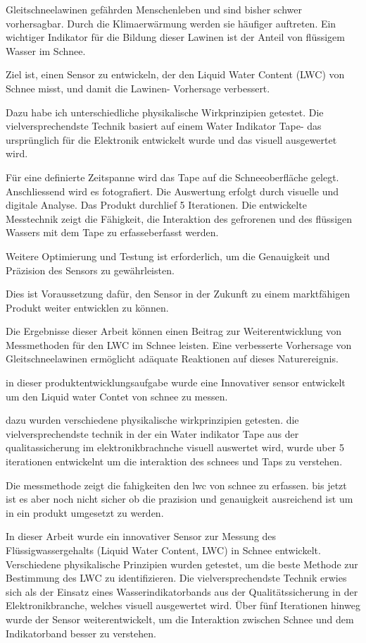 Gleitschneelawinen gefährden Menschenleben und sind bisher schwer vorhersagbar. Durch die Klimaerwärmung werden sie häufiger auftreten. Ein wichtiger Indikator für die Bildung dieser Lawinen ist der Anteil von flüssigem Wasser im Schnee.

Ziel ist, einen Sensor zu entwickeln, der den Liquid Water Content (LWC) von Schnee misst, und damit die Lawinen- Vorhersage verbessert.

Dazu habe ich unterschiedliche  physikalische Wirkprinzipien getestet. 
Die vielversprechendste Technik basiert auf einem Water Indikator Tape- das ursprünglich für die Elektronik entwickelt wurde und  das visuell ausgewertet wird.

 Für eine definierte Zeitspanne wird das Tape auf die Schneeoberfläche gelegt. Anschliessend wird es fotografiert. Die Auswertung erfolgt durch visuelle und digitale Analyse.
Das Produkt durchlief 5 Iterationen. Die entwickelte Messtechnik zeigt die Fähigkeit, die Interaktion des gefrorenen und des flüssigen Wassers mit dem Tape zu erfasseberfasst werden.

Weitere Optimierung und Testung ist erforderlich, um die Genauigkeit und Präzision des Sensors zu gewährleisten.

Dies ist Voraussetzung dafür, den Sensor in der Zukunft zu einem marktfähigen Produkt weiter entwicklen zu können.

Die Ergebnisse dieser Arbeit können einen Beitrag zur Weiterentwicklung von Messmethoden für den LWC im Schnee leisten. Eine  verbesserte Vorhersage von Gleitschneelawinen ermöglicht adäquate Reaktionen auf dieses Naturereignis. 

\iffalse


in dieser produktentwicklungsaufgabe wurde eine Innovativer sensor entwickelt um den Liquid water Contet von schnee zu messen.

dazu wurden verschiedene physikalische wirkprinzipien getesten. die vielversprechendste technik in der ein Water indikator Tape aus der qualitassicherung im elektronikbrachnche visuell auswertet wird, wurde uber 5 iterationen entwickelnt um die interaktion des schnees und Taps zu verstehen.


Die messmethode zeigt die fahigkeiten den lwc von schnee zu erfassen. bis jetzt ist es aber noch nicht sicher ob die prazision und genauigkeit ausreichend ist um in ein produkt umgesetzt zu werden.


In dieser Arbeit wurde ein innovativer Sensor zur Messung des Flüssigwassergehalts (Liquid Water Content, LWC) in Schnee entwickelt. Verschiedene physikalische Prinzipien wurden getestet, um die beste Methode zur Bestimmung des LWC zu identifizieren. Die vielversprechendste Technik erwies sich als der Einsatz eines Wasserindikatorbands aus der Qualitätssicherung in der Elektronikbranche, welches visuell ausgewertet wird. Über fünf Iterationen hinweg wurde der Sensor weiterentwickelt, um die Interaktion zwischen Schnee und dem Indikatorband besser zu verstehen.

